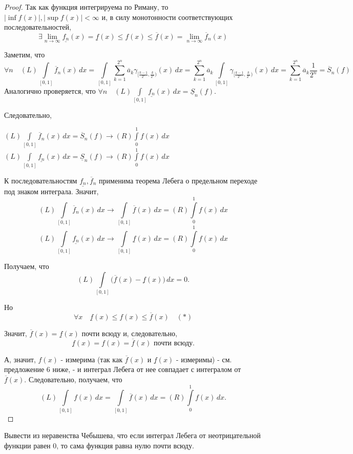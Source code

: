 \documentclass[a4paper]{article}
\newcommand{\nsb}{n\rightarrow \infty} %
\newcommand{\lin} {\lim \limits_{\nsb} }
\begin{document}
\begin{proof}
Так как функция интегрируема по Риману, то $|\inf f(x)|, |\sup
f(x)| < \infty$ и, в силу монотонности соответствующих
последовательностей,
$$\exists \lin \underline{f_n}(x) = \underline{f}(x) \leqslant
f(x) \leqslant \overline{f}(x) =\lin \overline{f}_n(x)$$

Заметим, что
$$\forall n \quad (L) \int \limits_{[0,1]}
\overline{f}_n(x) \, dx = \int \limits_{[0,1]} \sum
\limits_{k=1}^{2^n}\overline{a}_k \gamma_{[\frac{k-1}{2^n} ,
\frac{k}{2^n})}(x) \, dx =  \sum \limits_{k=1}^{2^n}\overline{a}_k
\int \limits_{[0,1]} \gamma_{[\frac{k-1}{2^n} , \frac{k}{2^n})}(x)
\, dx = \sum \limits_{k=1}^{2^n}\overline{a}_k \frac{1}{2^n}
=\overline{S}_n(f)
$$ Аналогично проверяется, что $\forall n \quad (L)\int \limits_{[0,1]}
\underline{f_n}(x) \, dx = \underline{S}_n(f)$.

Следовательно,

$(L)\int \limits_{[0,1]} \overline{f}_n(x) \, dx=
\overline{S}_n(f) \rightarrow (R) \int \limits_0^1 f(x) \,
dx$\\$(L)\int \limits_{[0,1]} \underline{f_n}(x) \, dx =
\underline{S}_n(f) \rightarrow (R) \int \limits_0^1 f(x) \, dx$

К последовательностям $\underline{f_n} , \overline{f}_n$ применима
теорема Лебега о предельном переходе под знаком интеграла. Значит,
$$(L)\int \limits_{[0,1]} \overline{f}_n(x) \,dx \rightarrow \int \limits_{[0,1]} \overline{f}(x) \,
dx = (R) \int \limits_0^1 f(x) \, dx$$
$$(L)\int \limits_{[0,1]} \underline{f_n}(x) \,dx \rightarrow \int \limits_{[0,1]} \underline{f}(x) \,
dx = (R) \int \limits_0^1 f(x) \, dx$$

Получаем, что $$(L) \int \limits_{[0,1]} \bigl( \overline{f}(x) -
\underline{f}(x) \bigr) \, dx = 0.$$

Но
$$\forall x \quad \underline{f}(x) \leqslant f(x)
\leqslant \overline{f} (x) \quad (*)$$

Значит, $\overline{f}(x)= \underline{f}(x)$ почти всюду и,
следовательно,
$$\underline{f}(x) = f(x) =\overline{f}(x)\mbox{ почти всюду.}$$

А, значит, $f(x)$ - измерима (так как $\overline{f}(x)$ и
$\underline{f}(x)$ - измеримы) - см. предложение 6 ниже, - и
интеграл Лебега от нее совпадает с интегралом от
$\overline{f}(x)$. Следовательно, получаем, что
$$(L)\int \limits_{[0,1]} f(x) \, dx = \int \limits_{[0,1]}
\overline{f}(x) \, dx = (R) \int \limits_0^1 f(x) \, dx.$$
\end{proof}
\begin{problem} Вывести из неравенства Чебышева, что если интеграл
Лебега от неотрицательной функции равен 0, то сама функция равна
нулю почти всюду.
\end{problem}
\end{document}

